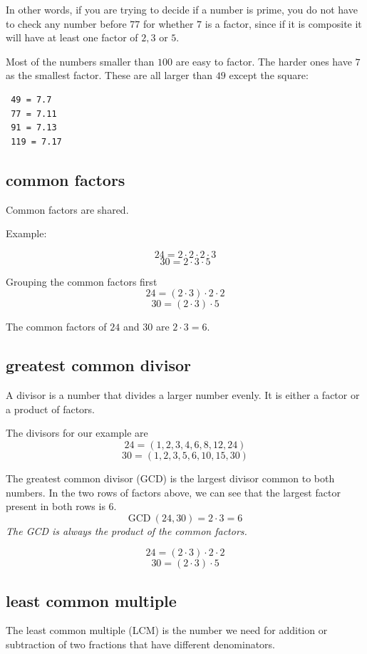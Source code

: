 \documentclass[11pt, oneside]{article}
\begin{document}
In other words, if you are trying to decide if a number is prime, you do not have to check any number before $77$ for whether $7$ is a factor, since if it is composite it will have at least one factor of $2, 3$ or $5$.

Most of the numbers smaller than $100$ are easy to factor.  The harder ones have $7$ as the smallest factor.  These are all larger than $49$ except the square:

\begin{verbatim}
 49 = 7.7
 77 = 7.11
 91 = 7.13
 119 = 7.17
\end{verbatim}

\subsection*{common factors}

Common factors are shared.

Example:

\[ 24 = 2 \cdot 2 \cdot 2 \cdot 3 \]
\[ 30 = 2 \cdot 3 \cdot 5 \]

Grouping the common factors first
\[ 24 = (2 \cdot 3) \cdot 2 \cdot 2 \]
\[ 30 = (2 \cdot 3) \cdot 5 \]

The common factors of $24$ and $30$ are $2 \cdot 3 = 6$.  

\subsection*{greatest common divisor}

A divisor is a number that divides a larger number evenly.  It is either a factor or a product of factors.

The divisors for our example are
\[ 24 = (1, 2, 3, 4, 6, 8, 12, 24) \]
\[ 30 = (1, 2, 3, 5, 6, 10, 15, 30) \]

The greatest common divisor (GCD) is the largest divisor common to both numbers.  In the two rows of factors above, we can see that the largest factor present in both rows is $6$.  
\[ \text{GCD} \ (24,30) = 2 \cdot 3 = 6 \]
\emph{The GCD is always the product of the common factors.}

\[ 24 = (2 \cdot 3) \cdot 2 \cdot 2 \]
\[ 30 = (2 \cdot 3) \cdot 5 \]

\subsection*{least common multiple}

The least common multiple (LCM) is the number we need for addition or subtraction of two fractions that have different denominators.
\end{document}

